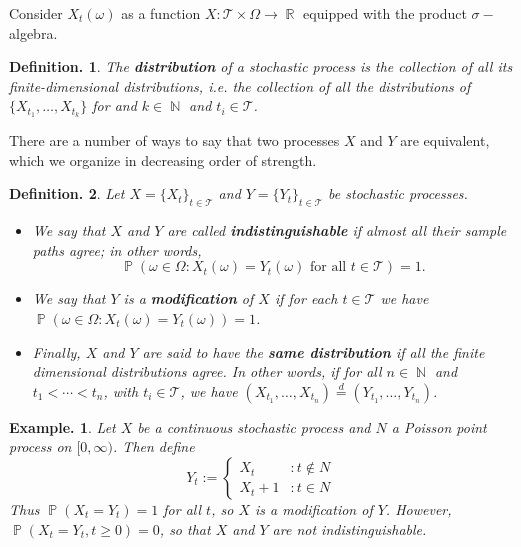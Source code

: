 \documentclass[11pt, a4paper]{memoir}
\DeclareMathOperator{\N}{{\mathbb{N}}}
\DeclareMathOperator{\R}{{\mathbb{R}}}
\theoremstyle{change}
\theoremstyle{plain}
\theoremstyle{nonumberplain}
\newtheorem{definition}{Definition.}
\newtheorem{example}{Example.}
\DeclareMathOperator{\pr}{{\mathbb{P}}}
\newcommand{\defn}[1]{{\boldmath\bfseries #1}}
\numberwithin{equation}{section}
\begin{document}
Consider $X_t(\omega)$ as a function $X:\mathcal{T}\times\Omega\to \R$ equipped with the product $\sigma-$algebra.
\begin{definition}
    The \defn{distribution} of a stochastic process is the collection of all its finite-dimensional distributions, i.e. the collection of all the distributions of $\{X_{t_1},\ldots,X_{t_k}\}$ for and $k\in\N$ and $t_i\in \mathcal{T}$.
\end{definition}
There are a number of ways to say that two processes $X$ and $Y$ are equivalent, which we organize in decreasing order of strength.
\begin{definition}
    Let $X=\{X_t\}_{t\in \mathcal{T}}$ and $Y=\{Y_t\}_{t\in \mathcal{T}}$ be stochastic processes.
    \begin{itemize}[nl]
        \item We say that $X$ and $Y$ are called \defn{indistinguishable} if almost all their sample paths agree; in other words,
            \begin{equation*}
                \pr(\omega\in\Omega:X_t(\omega)=Y_t(\omega)\text{ for all }t\in \mathcal{T})=1.
            \end{equation*}
        \item We say that $Y$ is a \defn{modification} of $X$ if for each $t\in \mathcal{T}$ we have $\pr(\omega\in\Omega:X_t(\omega)=Y_t(\omega))=1$.
        \item Finally, $X$ and $Y$ are said to have the \defn{same distribution} if all the finite dimensional distributions agree.
            In other words, if for all $n\in\N$ and $t_1<\cdots<t_n$, with $t_i\in \mathcal{T}$, we have $(X_{t_1},\ldots,X_{t_n})\overset{d}{=}(Y_{t_1},\ldots,Y_{t_n})$.
    \end{itemize}
\end{definition}
\begin{example}
    Let $X$ be a continuous stochastic process and $N$ a Poisson point process on $[0,\infty)$.
    Then define
    \begin{equation*}
        Y_t :=
        \begin{cases}
            X_t &: t\notin N\\
            X_t+1 &:t\in N
        \end{cases}
    \end{equation*}
    Thus $\pr(X_t=Y_t)=1$ for all $t$, so $X$ is a modification of $Y$.
    However, $\pr(X_t=Y_t,t\geq 0)=0$, so that $X$ and $Y$ are not indistinguishable.
\end{example}
\end{document}

